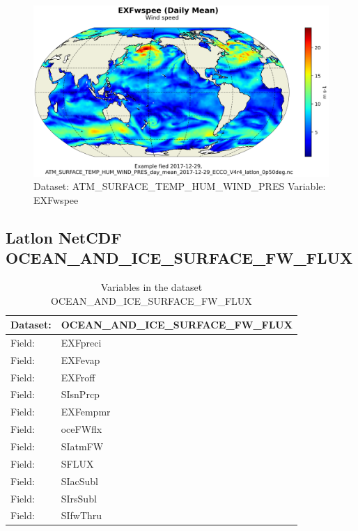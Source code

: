 \begin{figure}[H]
\centering
\includegraphics[scale=0.55]{../images/plots/latlon_plots/Atmosphere_Surface_Temperature_Humidity_Wind_and_Pressure/EXFwspee.png}
\caption{Dataset: ATM\_SURFACE\_TEMP\_HUM\_WIND\_PRES Variable: EXFwspee}
\label{tab:table-ATM_SURFACE_TEMP_HUM_WIND_PRES_EXFwspee-Plot}
\end{figure}
\pagebreak
\subsection{Latlon NetCDF OCEAN\_AND\_ICE\_SURFACE\_FW\_FLUX}
\newp
\begin{longtable}{|p{}|p{}|}
\caption{Variables in the dataset OCEAN\_AND\_ICE\_SURFACE\_FW\_FLUX}
\label{tab:table-OCEAN_AND_ICE_SURFACE_FW_FLUX-fields} \\ 
\hline \endhead \hline \endfoot
\rowcolor{lightgray} \textbf{Dataset:} & \textbf{OCEAN\_AND\_ICE\_SURFACE\_FW\_FLUX} \\ \hline
Field: &EXFpreci \\ \hline
Field: &EXFevap \\ \hline
Field: &EXFroff \\ \hline
Field: &SIsnPrcp \\ \hline
Field: &EXFempmr \\ \hline
Field: &oceFWflx \\ \hline
Field: &SIatmFW \\ \hline
Field: &SFLUX \\ \hline
Field: &SIacSubl \\ \hline
Field: &SIrsSubl \\ \hline
Field: &SIfwThru \\ \hline
\end{longtable}

